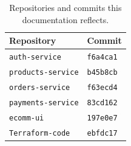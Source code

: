 \begin{table}[H]
\centering
\caption{Repositories and commits this documentation reflects.}
\label{tab:evidence-commits}
\small
\begin{tabular}{ll}
\toprule
\textbf{Repository} & \textbf{Commit} \\
\midrule
\texttt{auth-service} & \texttt{f6a4ca1} \\
\texttt{products-service} & \texttt{b45b8cb} \\
\texttt{orders-service} & \texttt{f63ecd4} \\
\texttt{payments-service} & \texttt{83cd162} \\
\texttt{ecomm-ui} & \texttt{197e0e7} \\
\texttt{Terraform-code} & \texttt{ebfdc17} \\
\bottomrule
\end{tabular}
\end{table}
